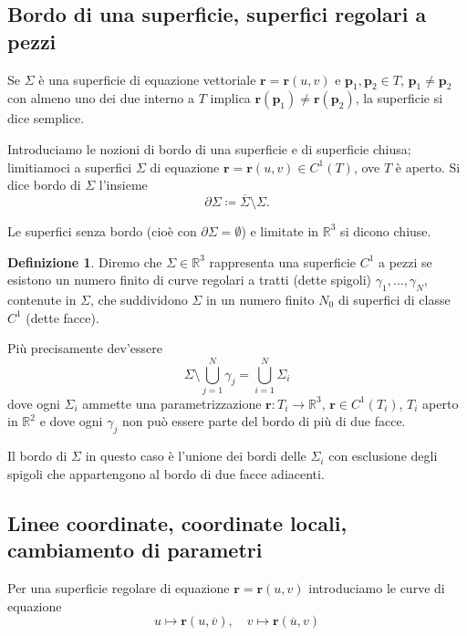 \documentclass[a4paper]{book}
\numberwithin{equation}{section}
\theoremstyle{plain}
\theoremstyle{definition}
\newtheorem{defn}{Definizione}[section]
\theoremstyle{remark}
\renewcommand{\vec}{\boldsymbol}
\theoremstyle{example}
\begin{document}
\subsection{Bordo di una superficie, superfici regolari a pezzi}
Se $\Sigma$ è una superficie di equazione vettoriale $\vec{r} = \vec{r}(u, v)$ e $\vec{p}_1, \vec{p}_2 \in T$, $\vec{p}_1 \ne \vec{p}_2$ con almeno uno dei due interno a $T$ implica $\vec{r}(\vec{p}_1) \ne \vec{r}(\vec{p}_2)$, la superficie si dice semplice.

Introduciamo le nozioni di bordo di una superficie e di superficie chiusa; limitiamoci a superfici $\Sigma$ di equazione $\vec{r} = \vec{r}(u, v) \in C^1(T)$, ove $T$ è aperto. Si dice bordo di $\Sigma$ l'insieme
\begin{equation*}
	\partial \Sigma \coloneqq \overline{\Sigma}\setminus \Sigma.
\end{equation*}

Le superfici senza bordo (cioè con $\partial \Sigma = \emptyset$) e limitate in $\mathbb{R}^3$ si dicono chiuse.

\begin{defn}
	Diremo che $\Sigma \in \mathbb{R}^3$ rappresenta una superficie $C^1$ a pezzi se esistono un numero finito di curve regolari a tratti (dette spigoli) $\gamma_1, \dots, \gamma_N$, contenute in $\Sigma$, che suddividono $\Sigma$ in un numero finito $N_0$ di superfici di classe $C^1$ (dette facce).
\end{defn}

Più precisamente dev'essere
\begin{equation*}
	\Sigma \setminus \bigcup_{j=1}^N \gamma_j = \bigcup_{i = 1}^N \Sigma_i
\end{equation*}
dove ogni $\Sigma_i$ ammette una parametrizzazione $\vec{r}\colon T_i \to \mathbb{R}^3$, $\vec{r} \in C^1(T_i)$, $T_i$ aperto in $\mathbb{R}^2$ e dove ogni $\gamma_j$ non può essere parte del bordo di più di due facce.

Il bordo di $\Sigma$ in questo caso è l'unione dei bordi delle $\Sigma_i$ con esclusione degli spigoli che appartengono al bordo di due facce adiacenti.

\subsection{Linee coordinate, coordinate locali, cambiamento di parametri}
Per una superficie regolare di equazione $\vec{r} = \vec{r}(u, v)$ introduciamo le curve di equazione
\begin{equation}
	\label{eqn:lineecoordinate}
	u \mapsto \vec{r}(u, \overline{v}), \quad v \mapsto \vec{r}(\overline{u}, v)
\end{equation}
\end{document}
